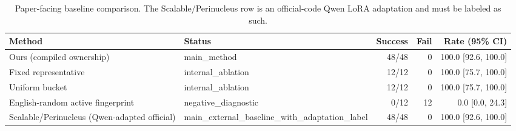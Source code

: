 \begin{table}[t]
\centering
\small
\begin{tabular}{llrrr}
\toprule
Method & Status & Success & Fail & Rate (95\% CI) \\
\midrule
Ours (compiled ownership) & main\_method & 48/48 & 0 & 100.0 [92.6, 100.0] \\
Fixed representative & internal\_ablation & 12/12 & 0 & 100.0 [75.7, 100.0] \\
Uniform bucket & internal\_ablation & 12/12 & 0 & 100.0 [75.7, 100.0] \\
English-random active fingerprint & negative\_diagnostic & 0/12 & 12 & 0.0 [0.0, 24.3] \\
Scalable/Perinucleus (Qwen-adapted official) & main\_external\_baseline\_with\_adaptation\_label & 48/48 & 0 & 100.0 [92.6, 100.0] \\
\bottomrule
\end{tabular}
\caption{Paper-facing baseline comparison. The Scalable/Perinucleus row is an official-code Qwen LoRA adaptation and must be labeled as such.}
\end{table}
